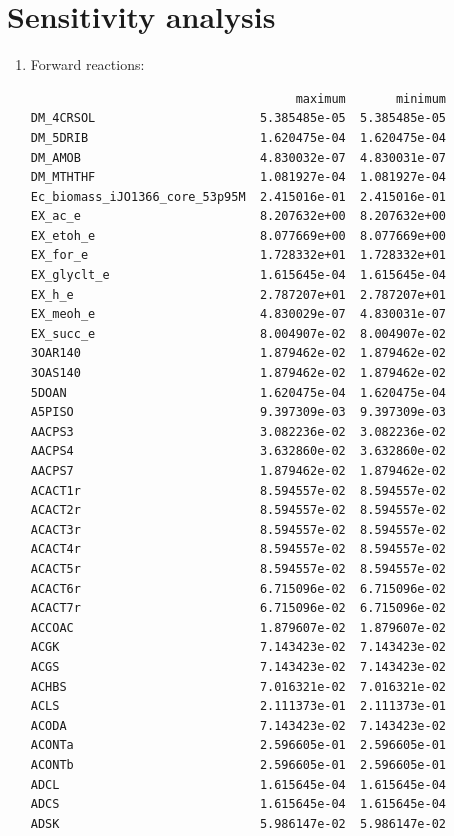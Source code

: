 \documentclass{scrartcl}
\begin{document}
\section{Sensitivity analysis}
\begin{enumerate}
\item Forward reactions:
\begin{lstlisting}
                                     maximum       minimum
DM_4CRSOL                       5.385485e-05  5.385485e-05
DM_5DRIB                        1.620475e-04  1.620475e-04
DM_AMOB                         4.830032e-07  4.830031e-07
DM_MTHTHF                       1.081927e-04  1.081927e-04
Ec_biomass_iJO1366_core_53p95M  2.415016e-01  2.415016e-01
EX_ac_e                         8.207632e+00  8.207632e+00
EX_etoh_e                       8.077669e+00  8.077669e+00
EX_for_e                        1.728332e+01  1.728332e+01
EX_glyclt_e                     1.615645e-04  1.615645e-04
EX_h_e                          2.787207e+01  2.787207e+01
EX_meoh_e                       4.830029e-07  4.830031e-07
EX_succ_e                       8.004907e-02  8.004907e-02
3OAR140                         1.879462e-02  1.879462e-02
3OAS140                         1.879462e-02  1.879462e-02
5DOAN                           1.620475e-04  1.620475e-04
A5PISO                          9.397309e-03  9.397309e-03
AACPS3                          3.082236e-02  3.082236e-02
AACPS4                          3.632860e-02  3.632860e-02
AACPS7                          1.879462e-02  1.879462e-02
ACACT1r                         8.594557e-02  8.594557e-02
ACACT2r                         8.594557e-02  8.594557e-02
ACACT3r                         8.594557e-02  8.594557e-02
ACACT4r                         8.594557e-02  8.594557e-02
ACACT5r                         8.594557e-02  8.594557e-02
ACACT6r                         6.715096e-02  6.715096e-02
ACACT7r                         6.715096e-02  6.715096e-02
ACCOAC                          1.879607e-02  1.879607e-02
ACGK                            7.143423e-02  7.143423e-02
ACGS                            7.143423e-02  7.143423e-02
ACHBS                           7.016321e-02  7.016321e-02
ACLS                            2.111373e-01  2.111373e-01
ACODA                           7.143423e-02  7.143423e-02
ACONTa                          2.596605e-01  2.596605e-01
ACONTb                          2.596605e-01  2.596605e-01
ADCL                            1.615645e-04  1.615645e-04
ADCS                            1.615645e-04  1.615645e-04
ADSK                            5.986147e-02  5.986147e-02

\end{lstlisting}
\end{enumerate}
\end{document}
